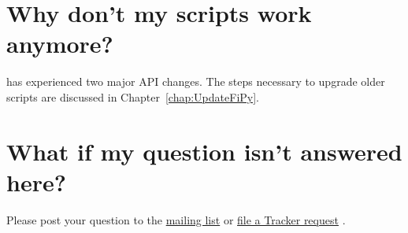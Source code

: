    \section{Why don't my scripts work anymore?}
        \FiPy{} has experienced two major API changes. The steps 
        necessary to upgrade older scripts are discussed in 
        Chapter~\ref{chap:UpdateFiPy}.

    \section{What if my question isn't answered here?}  
        
        Please post your question to the
        \href{http://www.ctcms.nist.gov/fipy/mail.html}{mailing list}
        \cite{FiPyMailingList} or
        \href{http://sourceforge.net/tracker/?group_id=118428}{file a
        Tracker request} \cite{FiPyBugTracker}.
